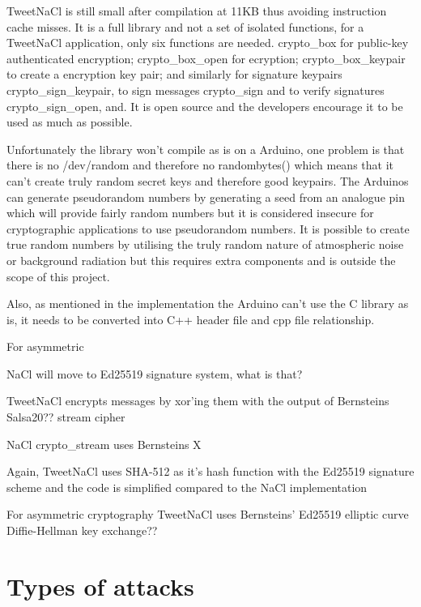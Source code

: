 TweetNaCl is still small after compilation at 11KB thus avoiding instruction cache misses. It is a full library and not a set of isolated functions, for a TweetNaCl application, only six functions are needed. crypto\_box for public-key authenticated encryption; crypto\_box\_open for ecryption; crypto\_box\_keypair to create a encryption key pair; and similarly for signature keypairs crypto\_sign\_keypair, to sign messages crypto\_sign and to verify signatures crypto\_sign\_open, and. It is open source and the developers encourage it to be used as much as possible. 

Unfortunately the library won't compile as is on a Arduino, one problem is that there is no /dev/random and therefore no randombytes() which means that it can't create truly random secret keys and therefore good keypairs. The Arduinos can generate pseudorandom numbers by generating a seed from an analogue pin which will provide fairly random numbers but it is considered insecure for cryptographic applications to use pseudorandom numbers\cite{arduinopseudo}. It is possible to create true random numbers by utilising the truly random nature of atmospheric noise or background radiation but this requires extra components and is outside the scope of this project. 

Also, as mentioned in the implementation the Arduino can't use the C library as is, it needs to be converted into C++ header file and cpp file relationship.

For asymmetric 

NaCl will move to Ed25519 signature system, what is that?

TweetNaCl encrypts messages by xor'ing them with the output of Bernsteins Salsa20?? stream cipher

NaCl crypto\_stream uses Bernsteins X

Again, TweetNaCl uses SHA-512 as it's hash function with the Ed25519 signature scheme and the code is simplified compared to the NaCl implementation

For asymmetric cryptography TweetNaCl uses Bernsteins' Ed25519 elliptic curve Diffie-Hellman key exchange?? 



\section{Types of attacks}

